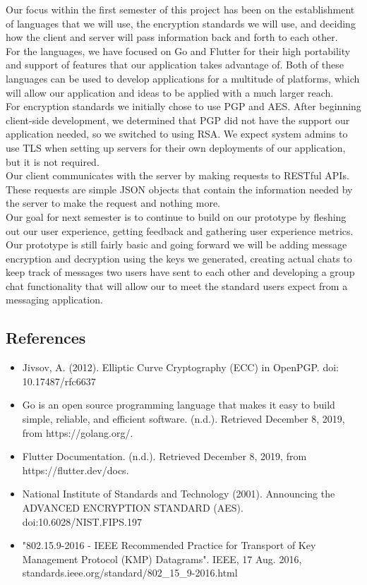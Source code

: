 \documentclass[11pt]{article}
\begin{document}
Our focus within the first semester of this project has been on the establishment of languages that we will use, the encryption standards we will use, and deciding how the client and server will pass information back and forth to each other. \\

For the languages, we have focused on Go and Flutter for their high portability and support of features that our application takes advantage of. Both of these languages can be used to develop applications for a multitude of platforms, which will allow our application and ideas to be applied with a much larger reach. \\

For encryption standards we initially chose to use PGP and AES. After beginning client-side development, we determined that PGP did not have the support our application needed, so we switched to using RSA. We expect system admins to use TLS when setting up servers for their own deployments of our application, but it is not required. \\

Our client communicates with the server by making requests to RESTful APIs. These requests are simple JSON objects that contain the information needed by the server to make the request and nothing more. \\

Our goal for next semester is to continue to build on our prototype by fleshing out our user experience, getting feedback and gathering user experience metrics. Our prototype is still fairly basic and going forward we will be adding message encryption and decryption using the keys we generated, creating actual chats to keep track of messages two users have sent to each other and developing a group chat functionality that will allow our to meet the standard users expect from a messaging application.

\subsection{References}
\begin{itemize}
	\item{Jivsov, A. (2012). Elliptic Curve Cryptography (ECC) in OpenPGP. doi: 10.17487/rfc6637}
	\item{Go is an open source programming language that makes it easy to build simple, reliable, and efficient software. (n.d.). Retrieved December 8, 2019, from https://golang.org/.}
	\item{Flutter Documentation. (n.d.). Retrieved December 8, 2019, from https://flutter.dev/docs.}
	\item{National Institute of Standards and Technology (2001). Announcing the ADVANCED ENCRYPTION STANDARD (AES). doi:10.6028/NIST.FIPS.197}
	\item{"802.15.9-2016 - IEEE Recommended Practice for Transport of Key Management Protocol (KMP) Datagrams". IEEE, 17 Aug. 2016, standards.ieee.org/standard/802\_15\_9-2016.html}
\end{itemize}
\end{document}
